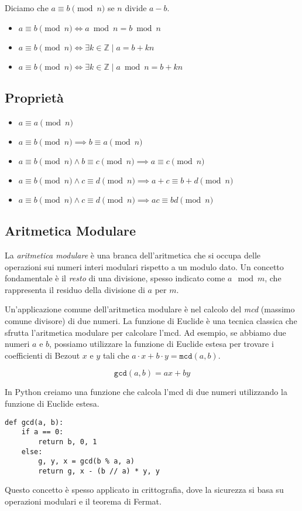 Diciamo che $a \equiv b \pmod{n}$ se $n$ divide $a-b$.

\begin{itemize}
    \item $a \equiv b \pmod{n} \iff a \bmod{n} = b \bmod{n}$
    \item $a \equiv b \pmod{n} \iff \exists k \in \mathbb{Z} \mid a = b + kn$
    \item $a \equiv b \pmod{n} \iff \exists k \in \mathbb{Z} \mid a \bmod{n} = b + kn$
\end{itemize}

\subsection{Proprietà}

\begin{itemize}
    \item $a \equiv a \pmod{n}$
    \item $a \equiv b \pmod{n} \implies b \equiv a \pmod{n}$
    \item $a \equiv b \pmod{n} \land b \equiv c \pmod{n} \implies a \equiv c \pmod{n}$
    \item $a \equiv b \pmod{n} \land c \equiv d \pmod{n} \implies a + c \equiv b + d \pmod{n}$
    \item $a \equiv b \pmod{n} \land c \equiv d \pmod{n} \implies ac \equiv bd \pmod{n}$
\end{itemize}

\subsection{Aritmetica Modulare}

La \emph{aritmetica modulare} è una branca dell'aritmetica che si
occupa delle operazioni sui numeri interi modulari rispetto a un modulo
dato. Un concetto fondamentale è il \emph{resto} di una divisione, spesso indicato come $a \mod m$, che rappresenta
il residuo della divisione di $a$ per $m$.

Un'applicazione comune dell'aritmetica modulare è nel calcolo del \emph{mcd} (massimo comune divisore) di due numeri.
La funzione di Euclide è una tecnica classica che sfrutta l'aritmetica modulare per calcolare l'mcd. Ad esempio,
se abbiamo due numeri $a$ e $b$, possiamo utilizzare la funzione di Euclide estesa per trovare i coefficienti di
Bezout $x$ e $y$ tali che $a \cdot x + b \cdot y = \texttt{mcd}(a, b)$.

\begin{equation}
\texttt{gcd}(a, b) = ax + by
\end{equation}

In Python creiamo una funzione che calcola l'mcd di due numeri utilizzando la funzione di Euclide estesa.

\begin{lstlisting}[style=pythonStyle]
def gcd(a, b):
    if a == 0:
        return b, 0, 1
    else:
        g, y, x = gcd(b % a, a)
        return g, x - (b // a) * y, y
\end{lstlisting}

Questo concetto è spesso applicato in crittografia, dove la sicurezza si basa su operazioni modulari e il teorema di Fermat.
